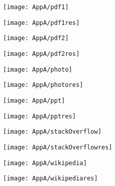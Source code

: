 \documentclass[draft,final]{vutinfth} %
\begin{document}
\begin{appendices}
\begin{figure}[H]
			\centering
			\begin{subfigure}[b]{0.45\columnwidth}
				\centering
				\texttt{[image: AppA/pdf1]}
			\end{subfigure}
			\begin{subfigure}[b]{0.45\columnwidth}
				\centering
				\texttt{[image: AppA/pdf1res]}
			\end{subfigure}
		\end{figure}   
			\begin{figure}[H]
			\centering
			\begin{subfigure}[b]{0.45\columnwidth}
				\centering
				\texttt{[image: AppA/pdf2]}
			\end{subfigure}
			\begin{subfigure}[b]{0.45\columnwidth}
				\centering
				\texttt{[image: AppA/pdf2res]}
			\end{subfigure}
		\end{figure}  
			\begin{figure}[H]
			\centering
			\begin{subfigure}[b]{0.45\columnwidth}
				\centering
				\texttt{[image: AppA/photo]}
			\end{subfigure}
			\begin{subfigure}[b]{0.45\columnwidth}
				\centering
				\texttt{[image: AppA/photores]}
			\end{subfigure}
		\end{figure}  
			\begin{figure}[H]
			\centering
			\begin{subfigure}[b]{0.45\columnwidth}
				\centering
				\texttt{[image: AppA/ppt]}
			\end{subfigure}
			\begin{subfigure}[b]{0.45\columnwidth}
				\centering
				\texttt{[image: AppA/pptres]}
			\end{subfigure}
		\end{figure}  
			\begin{figure}[H]
			\centering
			\begin{subfigure}[b]{0.45\columnwidth}
				\centering
				\texttt{[image: AppA/stackOverflow]}
			\end{subfigure}
			\begin{subfigure}[b]{0.45\columnwidth}
				\centering
				\texttt{[image: AppA/stackOverflowres]}
			\end{subfigure}
		\end{figure} 
			\begin{figure}[H]
			\centering
			\begin{subfigure}[b]{0.45\columnwidth}
				\centering
				\texttt{[image: AppA/wikipedia]}
			\end{subfigure}
			\begin{subfigure}[b]{0.45\columnwidth}
				\centering
				\texttt{[image: AppA/wikipediares]}
			\end{subfigure}
		\end{figure}   
		

\end{appendices}
\end{document}
